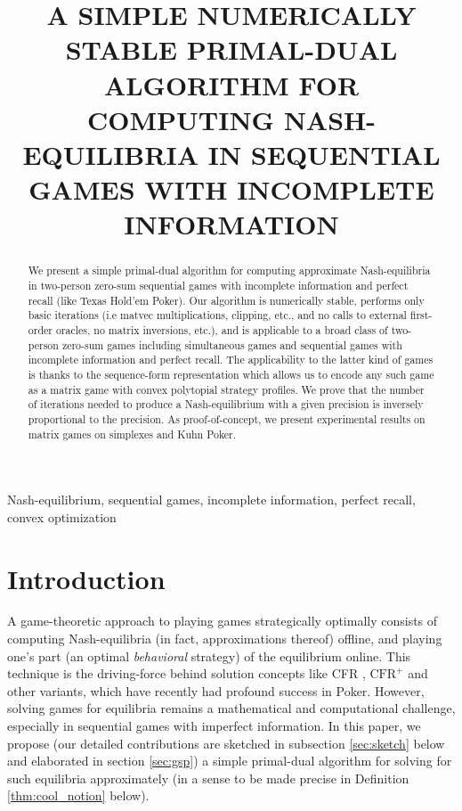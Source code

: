 \documentclass[a4paper,9pt]{extarticle}
\title{A SIMPLE NUMERICALLY STABLE PRIMAL-DUAL ALGORITHM FOR COMPUTING
  NASH-EQUILIBRIA IN SEQUENTIAL GAMES WITH INCOMPLETE INFORMATION}
\begin{document}
\maketitle
\begin{abstract}
We present a simple primal-dual algorithm for computing approximate
Nash-equilibria in two-person zero-sum sequential games with
incomplete information and perfect recall (like Texas Hold'em
Poker). Our algorithm is numerically stable, performs only basic
iterations (i.e matvec multiplications, clipping, etc., and no calls
to external first-order oracles, no matrix inversions, etc.), and is
applicable to a broad class of two-person zero-sum games including
simultaneous games and sequential games with incomplete information
and perfect recall. The applicability to the latter kind of games is
thanks to the sequence-form representation which allows us to encode
any such game as a matrix game with convex polytopial strategy
profiles. We prove that the number of iterations needed to produce a
Nash-equilibrium with a given precision is inversely proportional to
the precision. As proof-of-concept, we present experimental results on
matrix games on simplexes and Kuhn Poker.
\end{abstract}

\begin{keywords} Nash-equilibrium, sequential games,
  incomplete information, perfect recall, convex optimization
\end{keywords}
\section{Introduction}
\label{sec:intro}
A game-theoretic approach to playing games strategically optimally
consists of computing Nash-equilibria (in fact, approximations thereof)
offline, and playing one's part (an optimal \textit{behavioral}
strategy) of the equilibrium online. This
technique is the driving-force behind solution concepts like CFR
\cite{zinkevich2008regret,lanctot2009monte,Bowling09012015},
$\text{CFR}^{+}$ \cite{tammelin14} and other variants, which
have recently had profound success in Poker. However, solving games
for equilibria remains a mathematical and computational challenge,
especially in sequential games with imperfect information. In this
paper, we propose (our detailed contributions are sketched in
subsection \ref{sec:sketch} below and elaborated in section
\ref{sec:gsp}) a simple primal-dual algorithm for solving for such
equilibria approximately (in a sense to be made precise in Definition
\ref{thm:cool_notion} below).
\end{document}
